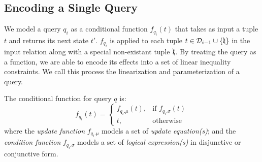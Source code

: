\subsection{Encoding a Single Query}%
\label{sec:linearize}

We model a query $q_i$ as a conditional function $f_{q_i}(t)$ that takes as input a tuple $t$
and returns its next state $t'$.  $f_{q_i}$ is applied to each 
tuple $t \in \mathcal{D}_{i-1} \cup \{\bcancel{t}\}$ in the input relation along with a special
non-existant tuple $\bcancel{t}$. 
By treating the query as a function, we are able to encode its effects into a set
of linear inequality constraints.  We call this process the linearization and 
parameterization of a query.

\begin{definition} 
\label{def:cond}
	The conditional function for query $q$ is:
	\[
    f_{q_i}(t)= 
    \begin{cases}
    f_{q_i.\mu} (t) ,& \text{if } f_{q_i.\sigma} (t)\\
    t,              & \text{otherwise}
    \end{cases}
\]
where the \textit{update function} $f_{q_i.\mu}$ models a set of \textit{update equation(s)};
and the \textit{condition function} $f_{q_i.\sigma}$ models a set of \textit{logical expression(s)} in 
disjunctive or conjunctive form.
\end{definition} 



